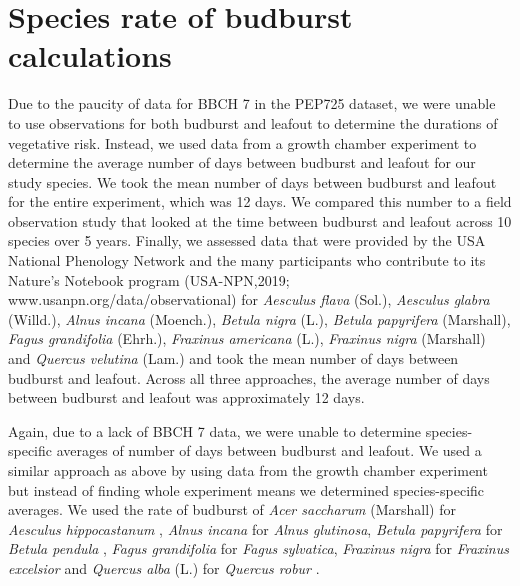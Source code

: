 \documentclass{article}\usepackage[]{graphicx}\usepackage[]{color}
\begin{document}
\section*{Species rate of budburst calculations}
Due to the paucity of data for BBCH 7 in the PEP725 dataset, we were unable to use observations for both budburst and leafout to determine the durations of vegetative risk. Instead, we used data from a growth chamber experiment \citep{Flynn2018} to determine the average number of days between budburst and leafout for our study species. We took the mean number of days between budburst and leafout for the entire experiment, which was 12 days. We compared this number to a field observation study \citep{Donnelly2017} that looked at the time between budburst and leafout across 10 species over 5 years. Finally, we assessed data that were provided by the USA National Phenology Network and the many participants who contribute to its Nature's Notebook program (USA-NPN,2019; www.usanpn.org/data/observational) for \textit{Aesculus flava} (Sol.), \textit{Aesculus glabra} (Willd.), \textit{Alnus incana} (Moench.), \textit{Betula nigra} (L.), \textit{Betula papyrifera} (Marshall), \textit{Fagus grandifolia} (Ehrh.), \textit{Fraxinus americana} (L.), \textit{Fraxinus nigra} (Marshall) and \textit{Quercus velutina} (Lam.) and took the mean number of days between budburst and leafout. Across all three approaches, the average number of days between budburst and leafout was approximately 12 days.  

Again, due to a lack of BBCH 7 data, we were unable to determine species-specific averages of number of days between budburst and leafout. We used a similar approach as above by using data from the growth chamber experiment \citep{Flynn2018} but instead of finding whole experiment means we determined species-specific averages. We used the rate of budburst of \textit{Acer saccharum} (Marshall) for \textit{Aesculus hippocastanum} \citep{Buerki2010}, \textit{Alnus incana} for \textit{Alnus glutinosa}, \textit{Betula papyrifera} for \textit{Betula pendula} \citep{Wang2016}, \textit{Fagus grandifolia} for \textit{Fagus sylvatica}, \textit{Fraxinus nigra} for \textit{Fraxinus excelsior} and \textit{Quercus alba} (L.) for \textit{Quercus robur} \citep{Hipp2017}.

\end{document}

